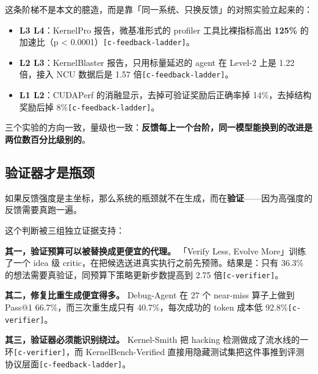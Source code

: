 这条阶梯不是本文的臆造，而是靠「同一系统、只换反馈」的对照实验立起来的：


\begin{itemize}
  \item \textbf{L3  L4}：KernelPro 报告，微基准形式的 profiler 工具比裸指标高出 \textbf{125\%} 的加速比（p < 0.0001）{\scriptsize\texttt{[c-\hspace{0pt}feedback-\hspace{0pt}ladder]}}。
  \item \textbf{L2  L3}：KernelBlaster 报告，只用标量延迟的 agent 在 Level-2 上是 1.22 倍，接入 NCU 数据后是 1.57 倍{\scriptsize\texttt{[c-\hspace{0pt}feedback-\hspace{0pt}ladder]}}。
  \item \textbf{L1  L2}：CUDAPerf 的消融显示，去掉可验证奖励后正确率掉 14\%，去掉结构奖励后掉 8\%{\scriptsize\texttt{[c-\hspace{0pt}feedback-\hspace{0pt}ladder]}}。
\end{itemize}

三个实验的方向一致，量级也一致：\textbf{反馈每上一个台阶，同一模型能换到的改进是两位数百分比级别的}。


\subsection{验证器才是瓶颈}

如果反馈强度是主坐标，那么系统的瓶颈就不在生成，而在\textbf{验证}——因为高强度的反馈需要真跑一遍。


这个判断被三组独立证据支持：


\textbf{其一，验证预算可以被替换成更便宜的代理。} 「Verify Less, Evolve More」训练了一个 idea 级 critic，在把候选送进真实执行之前先预筛。结果是：只有 36.3\% 的想法需要真验证，同预算下策略更新步数提高到 2.75 倍{\scriptsize\texttt{[c-\hspace{0pt}verifier]}}。


\textbf{其二，修复比重生成便宜得多。} Debug-Agent 在 27 个 near-miss 算子上做到 Pass@1 66.7\%，而三次重生成只有 40.7\%，每次成功的 token 成本低 92.8\%{\scriptsize\texttt{[c-\hspace{0pt}verifier]}}。


\textbf{其三，验证器必须能识别绕过。} Kernel-Smith 把 hacking 检测做成了流水线的一环{\scriptsize\texttt{[c-\hspace{0pt}verifier]}}，而 KernelBench-Verified 直接用隐藏测试集把这件事推到评测协议层面{\scriptsize\texttt{[c-\hspace{0pt}feedback-\hspace{0pt}ladder]}}。


